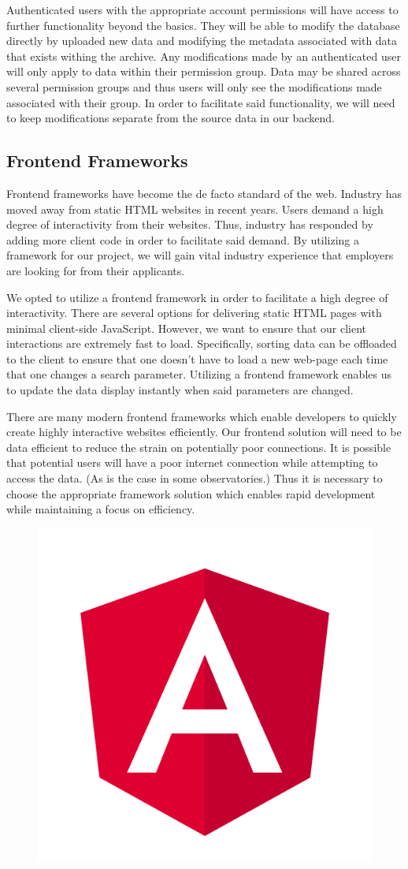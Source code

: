 \documentclass[12pt]{report}
\begin{document}
Authenticated users with the appropriate account permissions will have access to further functionality beyond the basics. They will be able to modify the database directly by uploaded new data and modifying the metadata associated with data that exists withing the archive. Any modifications made by an authenticated user will only apply to data within their permission group. Data may be shared across several permission groups and thus users will only see the modifications made associated with their group. In order to facilitate said functionality, we will need to keep modifications separate from the source data in our backend.

\subsection*{Frontend Frameworks}

Frontend frameworks have become the de facto standard of the web. Industry has moved away from static HTML websites in recent years. Users demand a high degree of interactivity from their websites. Thus, industry has responded by adding more client code in order to facilitate said demand. By utilizing a framework for our project, we will gain vital industry experience that employers are looking for from their applicants.

We opted to utilize a frontend framework in order to facilitate a high degree of interactivity. There are several options for delivering static HTML pages with minimal client-side JavaScript. However, we want to ensure that our client interactions are extremely fast to load. Specifically, sorting data can be offloaded to the client to ensure that one doesn't have to load a new web-page each time that one changes a search parameter. Utilizing a frontend framework enables us to update the data display instantly when said parameters are changed.

There are many modern frontend frameworks which enable developers to quickly create highly interactive websites efficiently. Our frontend solution will need to be data efficient to reduce the strain on potentially poor connections. It is possible that potential users will have a poor internet connection while attempting to access the data. (As is the case in some observatories.) Thus it is necessary to choose the appropriate framework solution which enables rapid development while maintaining a focus on efficiency.

\begin{figure}[h]
	\centering
	\includegraphics[width=0.251\linewidth]{angular}
\end{figure}
\end{document}
